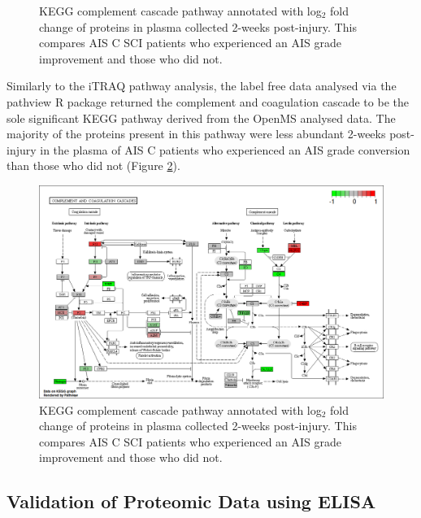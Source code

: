 \documentclass[
]{article}
\begin{document}
\begin{landscape}
\begin{landscape}
\begin{figure}
{}

\caption{KEGG complement cascade pathway annotated with log\(_2\) fold change of proteins in plasma collected 2-weeks post-injury. This compares AIS C SCI patients who experienced an AIS grade improvement and those who did not.}\label{fig:kegg-complement}
\end{figure}

Similarly to the iTRAQ pathway analysis, the label free data analysed via the pathview R package returned the complement and coagulation cascade to be the sole significant KEGG pathway derived from the OpenMS analysed data.
The majority of the proteins present in this pathway were less abundant 2-weeks post-injury in the plasma of AIS C patients who experienced an AIS grade conversion than those who did not (Figure \ref{fig:kegg-complement-chap4}).



\begin{figure}

{\centering \includegraphics[width=18.31in]{figures/kegg_pathways/hsa04610.pathview_label-free} 

}

\caption{KEGG complement cascade pathway annotated with log\(_2\) fold change of proteins in plasma collected 2-weeks post-injury. This compares AIS C SCI patients who experienced an AIS grade improvement and those who did not.}\label{fig:kegg-complement-chap4}
\end{figure}

\hypertarget{validation-of-proteomic-data-using-elisa}{%
\subsection{Validation of Proteomic Data using ELISA}\label{validation-of-proteomic-data-using-elisa}}


\end{landscape}
\end{landscape}
\end{document}
